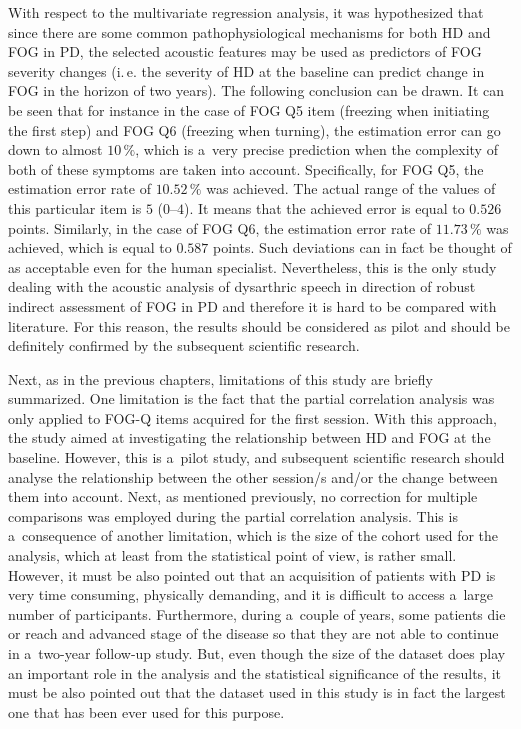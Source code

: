 With respect to the multivariate regression analysis, it was hypothesized that since there are some common pathophysiological mechanisms for both HD and FOG in PD, the selected acoustic features may be used as predictors of FOG severity changes (i.\,e. the severity of HD at the baseline can predict change in FOG in the horizon of two years). The following conclusion can be drawn. It can be seen that for instance in the case of FOG Q5 item (freezing when initiating the first step) and FOG Q6 (freezing when turning), the estimation error can go down to almost $10\,\%$, which is a~very precise prediction when the complexity of both of these symptoms are taken into account. Specifically, for FOG Q5, the estimation error rate of $10.52\,\%$ was achieved. The actual range of the values of this particular item is $5$ ($0$--$4$). It means that the achieved error is equal to $0.526$ points. Similarly, in the case of FOG Q6, the estimation error rate of $11.73\,\%$ was achieved, which is equal to $0.587$ points. Such deviations can in fact be thought of as acceptable even for the human specialist. Nevertheless, this is the only study dealing with the acoustic analysis of dysarthric speech in direction of robust indirect assessment of FOG in PD and therefore it is hard to be compared with literature. For this reason, the results should be considered as pilot and should be definitely confirmed by the subsequent scientific research.

Next, as in the previous chapters, limitations of this study are briefly summarized. One limitation is the fact that the partial correlation analysis was only applied to FOG-Q items acquired for the first session. With this approach, the study aimed at investigating the relationship between HD and FOG at the baseline. However, this is a~pilot study, and subsequent scientific research should analyse the relationship between the other session/s and/or the change between them into account. Next, as mentioned previously, no correction for multiple comparisons was employed during the partial correlation analysis. This is a~consequence of another limitation, which is the size of the cohort used for the analysis, which at least from the statistical point of view, is rather small. However, it must be also pointed out that an acquisition of patients with PD is very time consuming, physically demanding, and it is difficult to access a~large number of participants. Furthermore, during a~couple of years, some patients die or reach and advanced stage of the disease so that they are not able to continue in a~two-year follow-up study. But, even though the size of the dataset does play an important role in the analysis and the statistical significance of the results, it must be also pointed out that the dataset used in this study is in fact the largest one that has been ever used for this purpose.

